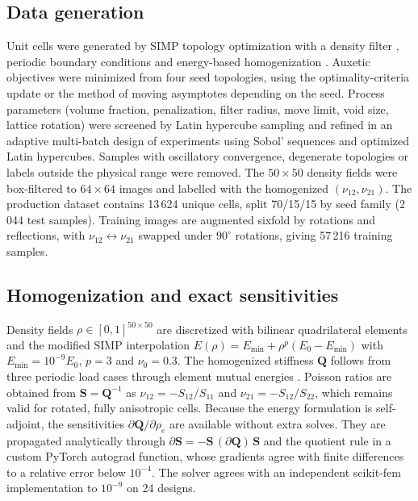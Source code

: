 \documentclass[a4paper,11pt]{article}
\newcommand{\nuot}{\nu_{12}}
\newcommand{\nuto}{\nu_{21}}
\begin{document}
\subsection{Data generation}
Unit cells were generated by SIMP topology optimization
\citep{bendsoe1989optimal,sigmund2001code,andreassen2011efficient} with a
density filter \citep{bourdin2001filters}, periodic boundary conditions and
energy-based homogenization
\citep{guedes1990preprocessing,andreassen2014homogenization,xia2015design}.
Auxetic objectives were minimized from four seed topologies, using the
optimality-criteria update or the method of moving asymptotes
\citep{svanberg1987mma} depending on the seed. Process parameters (volume
fraction, penalization, filter radius, move limit, void size, lattice
rotation) were screened by Latin hypercube sampling \citep{mckay1979lhs} and
refined in an adaptive multi-batch design of experiments using Sobol'
sequences \citep{sobol1967distribution} and optimized Latin hypercubes.
Samples with oscillatory convergence, degenerate topologies or labels outside
the physical range were removed. The $50\times50$ density fields were
box-filtered to $64\times64$ images and labelled with the homogenized
$(\nuot,\nuto)$. The production dataset contains 13\,624 unique cells, split
70/15/15 by seed family (2\,044 test samples). Training images are augmented
sixfold by rotations and reflections, with $\nuot\leftrightarrow\nuto$
swapped under $90^{\circ}$ rotations, giving 57\,216 training samples.

\subsection{Homogenization and exact sensitivities}
Density fields $\rho\in[0,1]^{50\times50}$ are discretized with bilinear
quadrilateral elements and the modified SIMP interpolation
$E(\rho)=E_{\min}+\rho^{p}(E_0-E_{\min})$ with $E_{\min}=10^{-9}E_0$, $p=3$
and $\nu_0=0.3$. The homogenized stiffness $\mathbf{Q}$ follows from three
periodic load cases through element mutual energies \citep{xia2015design}.
Poisson ratios are obtained from $\mathbf{S}=\mathbf{Q}^{-1}$ as
$\nuot=-S_{12}/S_{11}$ and $\nuto=-S_{12}/S_{22}$, which remains valid for
rotated, fully anisotropic cells. Because the energy formulation is
self-adjoint, the sensitivities $\partial\mathbf{Q}/\partial\rho_e$ are
available without extra solves. They are propagated analytically through
$\partial\mathbf{S}=-\mathbf{S}\,(\partial\mathbf{Q})\,\mathbf{S}$ and the
quotient rule in a custom PyTorch \citep{paszke2019pytorch} autograd
function, whose gradients agree with finite differences to a relative error
below $10^{-4}$. The solver agrees with an independent scikit-fem
\citep{gustafsson2020skfem} implementation to $10^{-9}$ on 24 designs.
\end{document}

